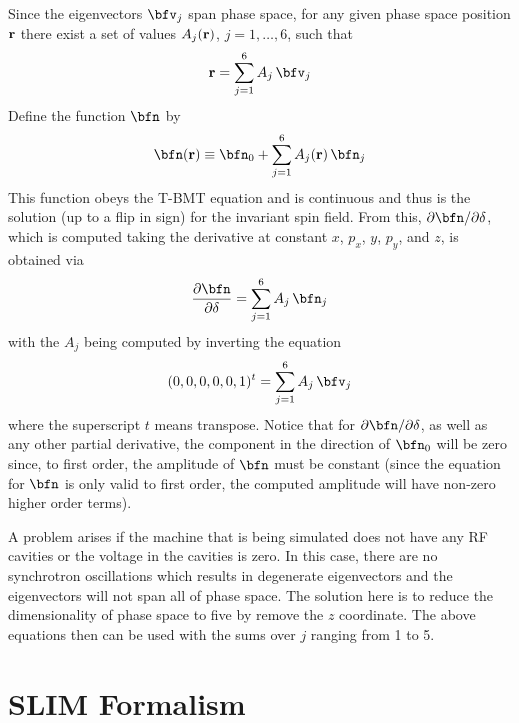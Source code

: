 {Since the eigenvectors $\bfv_j$ span phase space, for any given phase space position ${\bf r}$ there
exist a set of values $A_j({\bf r})$, $j = 1, \ldots, 6$, such that
\begin{equation}
  \bfr = \sum_{j = 1}^6 A_j \, \bfv_j
\end{equation}
Define the function $\bfn$ by
\begin{equation}
  \bfn(\bfr) \equiv \bfn_0 + \sum_{j = 1}^6 A_j(\bfr) \, \bfn_j
\end{equation}
This function obeys the T-BMT equation and is continuous and thus is the solution (up to a flip in
sign) for the invariant spin field. From this, ${\partial \bfn}/\partial \delta$, which is computed
taking the derivative at constant $x$, $p_x$, $y$, $p_y$, and $z$, is obtained via
\begin{equation}
  \frac{\partial \bfn}{\partial \delta} = 
  \sum_{j = 1}^6 A_j \, \bfn_j
  \label{ndan}
\end{equation}
with the $A_j$ being computed by inverting the equation
\begin{equation}
  (0, 0, 0, 0, 0, 1)^t = \sum_{j = 1}^6 A_j \, \bfv_j
  \label{000001}
\end{equation}
where the superscript $t$ means transpose. Notice that for ${\partial \bfn}/\partial \delta$, as
well as any other partial derivative, the component in the direction of $\bfn_0$ will be zero since,
to first order, the amplitude of $\bfn$ must be constant (since the equation for $\bfn$ is only
valid to first order, the computed amplitude will have non-zero higher order terms).

A problem arises if the machine that is being simulated does not have any RF cavities or the voltage
in the cavities is zero. In this case, there are no synchrotron oscillations which results in
degenerate eigenvectors and the eigenvectors will not span all of phase space. The solution here
is to reduce the dimensionality of phase space to five by remove the $z$ coordinate. The above
equations then can be used with the sums over $j$ ranging from 1 to 5.

\section{SLIM Formalism}
\label{s:slim}

}
